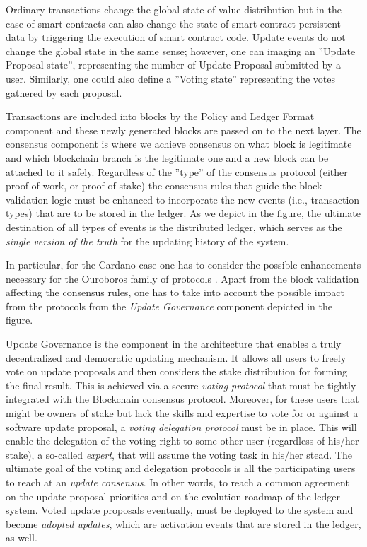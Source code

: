 Ordinary transactions change the global state of value distribution but in the case of smart contracts \cite{smart-contracts} can also change the state of smart contract persistent data by triggering the execution of smart contract code. Update events do not change the global state in the same sense; however, one can imaging an ''Update Proposal state'', representing the number of Update Proposal submitted by a user. Similarly, one could also define a ''Voting state'' representing the votes gathered by each proposal.

Transactions are included into blocks by the Policy and Ledger Format component and these newly generated blocks are passed on to the next layer. The consensus component is where we achieve consensus on what block is legitimate and which blockchain branch is the legitimate one and a new block can be attached to it safely. Regardless of the ''type'' of the consensus protocol (either proof-of-work, or proof-of-stake) the consensus rules that guide the block validation logic must be enhanced to incorporate the new events (i.e., transaction types) that are to be stored in the ledger. As we depict in the figure, the ultimate destination of all types of events is the distributed ledger, which serves as the \emph{single version of the truth} for the updating history of the system.

In particular, for the Cardano \cite{Cardano} case one has to consider the possible enhancements necessary for the Ouroboros family of protocols \cite{C:KRDO17}. Apart from the block validation affecting the consensus rules, one has to take into account the possible impact from the protocols from the \emph{Update Governance} component depicted in the figure.

Update Governance is the component in the architecture that enables a truly decentralized and democratic updating mechanism. It allows all users to freely vote on update proposals and then considers the stake distribution for forming the final result. This is achieved via a secure \emph{voting protocol} that must be tightly integrated with the Blockchain consensus protocol. Moreover, for these users that might be owners of stake but lack the skills and expertise to vote for or against a software update proposal, a \emph{voting delegation protocol} must be in place. This will enable the delegation of the voting right to some other user (regardless of his/her stake), a so-called \emph{expert}, that will assume the voting task in his/her stead. The ultimate goal of the voting and delegation protocols is all the participating users to reach at an \emph{update consensus}. In other words, to reach a common agreement on the update proposal priorities and on the evolution roadmap of the ledger system. Voted update proposals eventually, must be deployed to the system and become \emph{adopted updates}, which are activation events that are stored in the ledger, as well.

